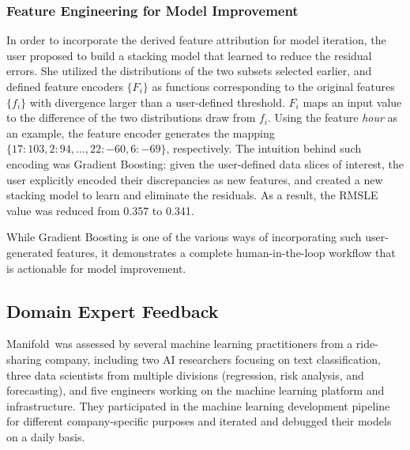 \documentclass[preprint,journal]{vgtc}       %
\newcommand{\revcolor}{black}
\newcommand{\techname}{Manifold}
\begin{document}
\color{\revcolor}
\subsubsection{Feature Engineering for Model Improvement}
In order to incorporate the derived feature attribution for model iteration, the user proposed to build a stacking model that learned to reduce the residual errors. She utilized the distributions of the two subsets selected earlier, and defined feature encoders $\{F_{i}\}$ as functions corresponding to the original features $\{f_{i}\}$ with divergence larger than a user-defined threshold. $F_{i}$ maps an input value to the difference of the two distributions draw from $f_{i}$. Using the feature \textit{hour} as an example, the feature encoder generates the mapping $\{17: 103, 2: 94, ..., 22: -60, 6: -69\}$, respectively. The intuition behind such encoding was Gradient Boosting: given the user-defined data slices of interest, the user explicitly encoded their discrepancies as new features, and created a new stacking model to learn and eliminate the residuals. As a result, the RMSLE value was reduced from 0.357 to 0.341.

While Gradient Boosting is one of the various ways of incorporating such user-generated features, it demonstrates a complete human-in-the-loop workflow that is actionable for model improvement.


\subsection{Domain Expert Feedback}
\label{sec:domain}
\color{\revcolor}
\techname\ was assessed by several machine learning practitioners from a ride-sharing company, including two AI researchers focusing on text classification, three data scientists from multiple divisions (regression, risk analysis, and forecasting), and five engineers working on the machine learning platform and infrastructure. They participated in the machine learning development pipeline for different company-specific purposes and iterated and debugged their models on a daily basis.
\end{document}
